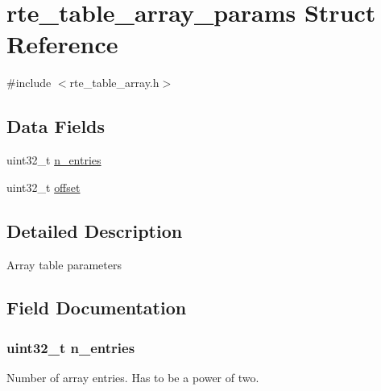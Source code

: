 \hypertarget{structrte__table__array__params}{}\section{rte\+\_\+table\+\_\+array\+\_\+params Struct Reference}
\label{structrte__table__array__params}


{\ttfamily \#include $<$rte\+\_\+table\+\_\+array.\+h$>$}

\subsection*{Data Fields}
\begin{DoxyCompactItemize}
\item 
uint32\+\_\+t \hyperlink{structrte__table__array__params_aafba5a1f8ad65b41148894026098cad7}{n\+\_\+entries}
\item 
uint32\+\_\+t \hyperlink{structrte__table__array__params_a894bdfa2d603d8343f8ef01dda6fcd23}{offset}
\end{DoxyCompactItemize}


\subsection{Detailed Description}
Array table parameters 

\subsection{Field Documentation}
\hypertarget{structrte__table__array__params_aafba5a1f8ad65b41148894026098cad7}{}
\subsubsection[{n\+\_\+entries}]{\setlength{\rightskip}{0pt plus 5cm}uint32\+\_\+t n\+\_\+entries}\label{structrte__table__array__params_aafba5a1f8ad65b41148894026098cad7}
Number of array entries. Has to be a power of two. \hypertarget{structrte__table__array__params_a894bdfa2d603d8343f8ef01dda6fcd23}{}
